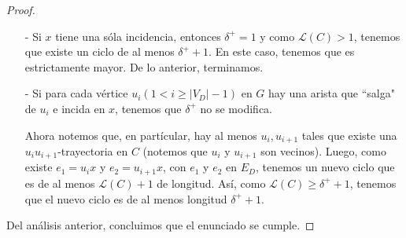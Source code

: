 \documentclass{article}
\begin{document}
\begin{enumerate}
\begin{proof}
      \begin{itemize}
        \item[-] Si $x$ tiene una sóla incidencia, entonces $\delta^+ = 1$ y como
          $\mathcal{L}(C) > 1$, tenemos que existe un ciclo de al menos $\delta^+ +1$.
          En este caso, tenemos que es estrictamente mayor. 
          De lo anterior, terminamos. 

        \item[-] Si para cada vértice $u_i(1 < i \geq |V_D| -1)$ en $G$ hay
          una arista que ``salga" de $u_i$ e incida en $x$, tenemos que $\delta^+$
          no se modifica.
          
          Ahora notemos que, en partícular, hay al menos
          $u_i, u_{i +1}$ tales que existe una $u_i u_{i +1}$-trayectoria en $C$
          (notemos que $u_i$ y $u_{i +1}$ son vecinos). 
          Luego, como existe $e_1 = u_i x$ y $e_{2} = u_{i +1} x$, con $e_1$
          y $e_2$ en $E_D$, tenemos un nuevo ciclo que es de al menos
          $\mathcal{L}(C) +1$ de longitud. 
          Así, como $\mathcal{L}(C) \geq \delta^+ +1$, tenemos que el nuevo ciclo es
          de al menos longitud $\delta^+ +1$.
      \end{itemize}
      Del análisis anterior, concluimos que el enunciado se cumple.
    \end{proof}
  \end{enumerate}
\end{document}
